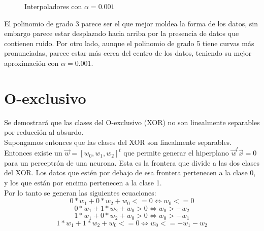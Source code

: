 \documentclass[a4paper]{article}
\begin{document}
	\begin{figure}[H]
	\centering
	\caption{Interpoladores con $\alpha = 0.001$}
	\label{f:interpolado001}
	\end{figure}	
	
	El polinomio de grado 3 parece ser el que mejor moldea la forma de los datos, sin embargo parece estar desplazado hacia arriba por la presencia de datos que contienen ruido. Por otro lado, aunque el polinomio de grado 5 tiene curvas más pronunciadas, parece estar más cerca del centro de los datos, teniendo su mejor aproximación con $\alpha = 0.001$.
	
	

\section{O-exclusivo}
Se demostrará que las clases del O-exclusivo (XOR) no son linealmente separables por reducción al absurdo.\\

Supongamos entonces que las clases del XOR son linealmente separables. Entonces existe un $\vec{w} = [w_{0}, w_{1}, w_{2}]^{t}$ que permite generar el hiperplano $\vec{w}^{t}\vec{x} = 0$ para un perceptrón de una neurona. Esta es la frontera que divide a las dos clases del XOR. Los datos que estén por debajo de esa frontera pertenecen a la clase 0, y los que están por encima pertenecen a la clase 1.\\

Por lo tanto se generan las siguientes ecuaciones:\\
\begin{equation}
0*w_{1} + 0*w_{2} + w_{0} <= 0 \iff w_{0} <= 0
\end{equation}
\begin{equation}
0*w_{1} + 1*w_{2} + w_{0} > 0 \iff w_{0} > -w_{2}
\end{equation}
\begin{equation}
1*w_{1} + 0*w_{2} + w_{0} > 0 \iff w_{0} > -w_{1}
\end{equation}
\begin{equation}
1*w_{1} + 1*w_{2} + w_{0} <= 0 \iff w_{0} <= -w_{1} - w_{2}
\end{equation}\\
\end{document}
